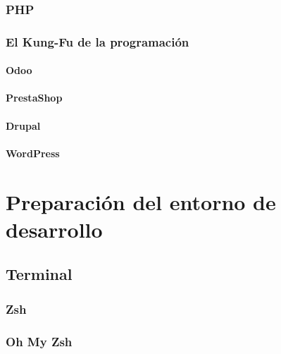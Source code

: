 \documentclass[a4paper,11pt,spanish]{sphinxmanual}
\begin{document}
\subsubsection{PHP}
\label{\detokenize{contenidos:id19}}

\subsubsection{El Kung-Fu de la programación}
\label{\detokenize{contenidos:id20}}

\paragraph{Odoo}
\label{\detokenize{contenidos:id21}}

\paragraph{PrestaShop}
\label{\detokenize{contenidos:id22}}

\paragraph{Drupal}
\label{\detokenize{contenidos:id23}}

\paragraph{WordPress}
\label{\detokenize{contenidos:id24}}

\section{Preparación del entorno de desarrollo}
\label{\detokenize{contenidos:id25}}

\subsection{Terminal}
\label{\detokenize{contenidos:id26}}

\subsubsection{Zsh}
\label{\detokenize{contenidos:id27}}

\subsubsection{Oh My Zsh}
\label{\detokenize{contenidos:id28}}
\end{document}
